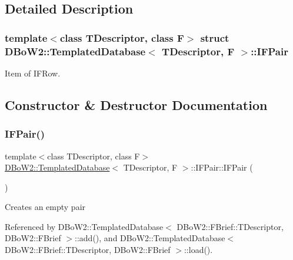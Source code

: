 \subsection{Detailed Description}
\subsubsection*{template$<$class T\+Descriptor, class F$>$\newline
struct D\+Bo\+W2\+::\+Templated\+Database$<$ T\+Descriptor, F $>$\+::\+I\+F\+Pair}

Item of I\+F\+Row. 

\subsection{Constructor \& Destructor Documentation}
\mbox{\label{structDBoW2_1_1TemplatedDatabase_1_1IFPair_af01918e869de76b592637b0fb4c55401}} 
\subsubsection{\texorpdfstring{I\+F\+Pair()}{IFPair()}\hspace{0.1cm}{\footnotesize\ttfamily [1/2]}}
{\footnotesize\ttfamily template$<$class T\+Descriptor, class F$>$ \\
\hyperlink{classDBoW2_1_1TemplatedDatabase}{D\+Bo\+W2\+::\+Templated\+Database}$<$ T\+Descriptor, F $>$\+::I\+F\+Pair\+::\+I\+F\+Pair (\begin{DoxyParamCaption}{ }\end{DoxyParamCaption})\hspace{0.3cm}{\ttfamily [inline]}}

Creates an empty pair 

Referenced by D\+Bo\+W2\+::\+Templated\+Database$<$ D\+Bo\+W2\+::\+F\+Brief\+::\+T\+Descriptor, D\+Bo\+W2\+::\+F\+Brief $>$\+::add(), and D\+Bo\+W2\+::\+Templated\+Database$<$ D\+Bo\+W2\+::\+F\+Brief\+::\+T\+Descriptor, D\+Bo\+W2\+::\+F\+Brief $>$\+::load().

